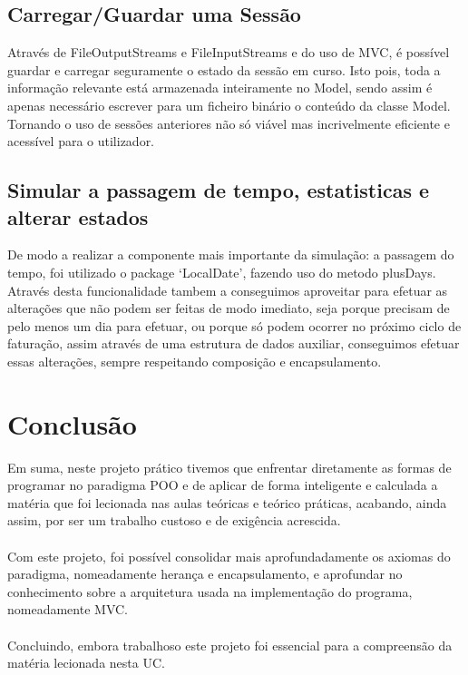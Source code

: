 \documentclass[10pt, a4paper]{article}
\begin{document}
\subsection{Carregar/Guardar uma Sessão}
        Através de FileOutputStreams e FileInputStreams e do uso de MVC, é possível guardar e carregar seguramente o estado da sessão em curso.
        Isto pois, toda a informação relevante está armazenada inteiramente no Model, sendo assim é apenas necessário escrever para um ficheiro binário o
        conteúdo da classe Model. Tornando o uso de sessões anteriores não só viável mas incrivelmente eficiente e acessível para o utilizador.
\subsection{Simular a passagem de tempo, estatisticas e alterar estados}
        De modo a realizar a componente mais importante da simulação: a passagem do tempo,
        foi utilizado o package `LocalDate', fazendo uso do metodo plusDays.
        Através desta funcionalidade tambem a conseguimos aproveitar para efetuar as alterações que não podem ser feitas de modo imediato,
        seja porque precisam de pelo menos um dia para efetuar, ou porque só podem ocorrer no próximo ciclo de faturação, assim através de
        uma estrutura de dados auxiliar, conseguimos efetuar essas alterações, sempre respeitando composição e encapsulamento.

\newpage
\section{Conclusão}
        Em suma, neste projeto prático tivemos que enfrentar diretamente as formas de programar no paradigma POO e de aplicar
        de forma inteligente e calculada a matéria que foi lecionada nas aulas teóricas e teórico práticas, acabando, ainda assim, por ser um trabalho custoso
        e de exigência acrescida. \\ \\
        Com este projeto, foi possível consolidar mais aprofundadamente os axiomas do paradigma, nomeadamente herança e encapsulamento, e aprofundar no
        conhecimento sobre a arquitetura usada na implementação do programa, nomeadamente MVC.\@ \\ \\
        Concluindo, embora trabalhoso este projeto foi essencial para a compreensão da matéria lecionada nesta UC.\@
\end{document}
